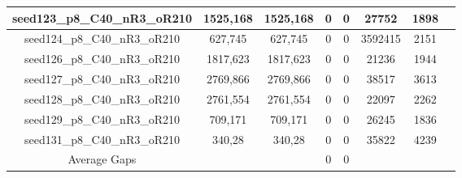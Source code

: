 \documentclass[a4paper]{article}
\begin{document}
\begin{center}
\begin{longtable}{cccccccc}
\hline
seed123\_p8\_C40\_nR3\_oR210 & 1525,168 & 1525,168 & 0 & 0 & 27752 & 1898\\
\hline
seed124\_p8\_C40\_nR3\_oR210 & 627,745 & 627,745 & 0 & 0 & 3592415 & 2151\\
\hline
seed126\_p8\_C40\_nR3\_oR210 & 1817,623 & 1817,623 & 0 & 0 & 21236 & 1944\\
\hline
seed127\_p8\_C40\_nR3\_oR210 & 2769,866 & 2769,866 & 0 & 0 & 38517 & 3613\\
\hline
seed128\_p8\_C40\_nR3\_oR210 & 2761,554 & 2761,554 & 0 & 0 & 22097 & 2262\\
\hline
seed129\_p8\_C40\_nR3\_oR210 & 709,171 & 709,171 & 0 & 0 & 26245 & 1836\\
\hline
seed131\_p8\_C40\_nR3\_oR210 & 340,28 & 340,28 & 0 & 0 & 35822 & 4239\\
\hline
\hline
Average Gaps & & & 0 & 0 & & \\
\hline
\hline
\end{longtable}
\end{center}
\end{document}
